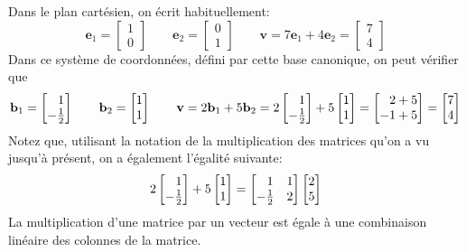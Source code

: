 \documentclass{article}
\begin{document}
Dans le plan cartésien, on écrit habituellement:
\[
\mathbf{e}_1 = \begin{bmatrix}
1 \\
0
\end{bmatrix}
\qquad
\mathbf{e}_2 = \begin{bmatrix}
0 \\
1
\end{bmatrix}
\qquad
\mathbf{v} = 7\mathbf{e}_1
+ 4 \mathbf{e}_2 = \begin{bmatrix}
7 \\ 4
\end{bmatrix}
\]
Dans ce système de coordonnées, défini par cette
base canonique, on peut vérifier que
\[
\mathbf{b}_1 = \begin{bmatrix}\hphantom{-}
1\\ -\frac12
\end{bmatrix}
\qquad
\mathbf{b}_2 = \begin{bmatrix}
1\\ 1
\end{bmatrix}
\qquad
\mathbf{v} = 2\mathbf{b}_1
+ 5 \mathbf{b}_2 = 2\begin{bmatrix}
\hphantom{-}1\\ -\frac12
\end{bmatrix} + 5 \begin{bmatrix}
1\\ 1
\end{bmatrix}
=
\begin{bmatrix}
\hphantom{-}2 + 5 \\ -1 + 5
\end{bmatrix}
= \begin{bmatrix}
7 \\ 4
\end{bmatrix}
\]
Notez que, utilisant la notation de la multiplication
des matrices qu'on a vu jusqu'à présent, on a également l'égalité suivante:
\[
2\begin{bmatrix}
\hphantom{-}1\\ -\frac12
\end{bmatrix} + 5 \begin{bmatrix}
1\\ 1
\end{bmatrix}
=
\begin{bmatrix}
\hphantom{-}1 & 1 \\
-\frac12 & 2
\end{bmatrix}
\begin{bmatrix}
2 \\ 5
\end{bmatrix}
\]
La multiplication d'une matrice par un vecteur
est égale à une combinaison linéaire des colonnes
de la matrice.
\end{document}

